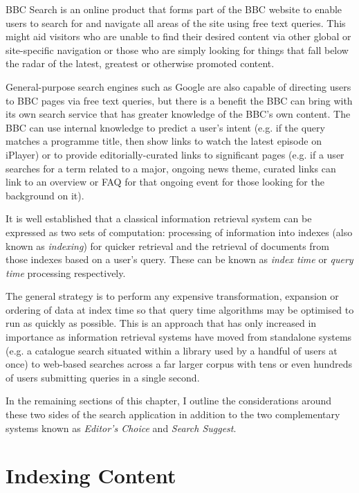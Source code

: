BBC Search is an online product that forms part of the BBC website
to enable users to search for and navigate all areas of the site using
free text queries. This might aid visitors who are unable to find their desired
content via other global or site-specific navigation or those who are simply
looking for things that fall below the radar of the latest, greatest or
otherwise promoted content.

General-purpose search engines such as Google are also capable of directing
users to BBC pages via free text queries, but there is a benefit the BBC
can bring with its own search service that has greater knowledge of the
BBC's own content. The BBC can use internal knowledge to predict a user's
intent (e.g. if the query matches a programme title, then show links to watch
the latest episode on iPlayer) or to provide editorially-curated
links to significant pages (e.g. if a user searches for a term
related to a major, ongoing news theme, curated links can
link to an overview or FAQ for that ongoing event for those
looking for the background on it).

It is well established that a classical information retrieval system
can be expressed as two sets of computation: processing of information
into indexes (also known as \emph{indexing}) for quicker retrieval
and the retrieval of documents from those indexes based on a user's
query. These can be known as \emph{index time} or \emph{query time}
processing respectively.

The general strategy is to perform
any expensive transformation, expansion or ordering of data
at index time so that query time algorithms may be optimised to
run as quickly as possible. This is an approach that has only
increased in importance as information retrieval systems have moved
from standalone systems (e.g. a catalogue search situated within
a library used by a handful of users at once) to web-based
searches across a far larger corpus with tens or even hundreds of
users submitting queries in a single second.

In the remaining sections of this chapter, I outline the considerations
around these two sides of the search application in addition to the
two complementary systems known as \emph{Editor's Choice} and
\emph{Search Suggest}.

\section{Indexing Content}


